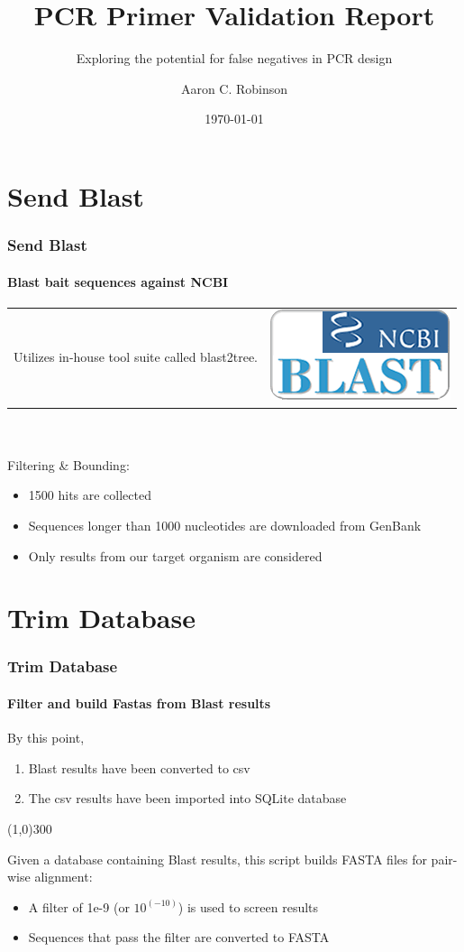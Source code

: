 \documentclass{beamer}
\title{PCR Primer Validation Report}
\subtitle{Exploring the potential for false negatives in PCR design}
\author{Aaron C. Robinson}
\date{\today} %
\newcommand{\sectiontitle}{}
\newcommand{\newsection}[1]{\renewcommand{\sectiontitle}{#1}\section{#1}}
\begin{document}
  \maketitle

  \newsection{Send Blast}
  \begin{frame}
    \frametitle{Send Blast}
    \framesubtitle{Blast bait sequences against NCBI}
    
    \begin{tabularx}{\textwidth}{l X}
    	  \hspace{-.35cm} Utilizes in-house tool suite called blast2tree. & \includegraphics[scale=.25]{ncbi_blast}
    \end{tabularx} \\ \hfill \\

    Filtering \& Bounding:
    
	\begin{itemize} \itemsep1em
	  \item 1500 hits are collected
	  \item Sequences longer than 1000 nucleotides are downloaded from GenBank
	  \item Only results from our target organism are considered
	\end{itemize}
	
  \end{frame}
  
  \newsection{Trim Database}
  \begin{frame}
    \frametitle{Trim Database}
    \framesubtitle{Filter and build Fastas from Blast results}
    
	By this point,
	
	\begin{enumerate} \itemsep1em
	  \item Blast results have been converted to csv
	  \item The csv results have been imported into SQLite database
	\end{enumerate}
	
	\vspace{-1cm} \begin{center}
	  \line(1,0){300}
	\end{center}
	
	Given a database containing Blast results, this script builds FASTA files for pair-wise alignment:
    
    \begin{itemize} \itemsep1em
	  \item A filter of 1e-9 (or $10^(-10)$) is used to screen results
	  \item Sequences that pass the filter are converted to FASTA
	\end{itemize}
	
  \end{frame}
  
\end{document}
